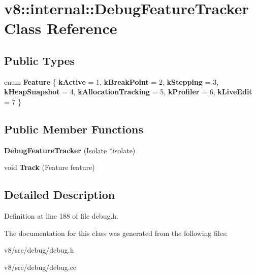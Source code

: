 \hypertarget{classv8_1_1internal_1_1DebugFeatureTracker}{}\section{v8\+:\+:internal\+:\+:Debug\+Feature\+Tracker Class Reference}
\label{classv8_1_1internal_1_1DebugFeatureTracker}
\subsection*{Public Types}
\begin{DoxyCompactItemize}
\item 
\mbox{\label{classv8_1_1internal_1_1DebugFeatureTracker_aba2ecbdea37741ea461e4714d937af5e}} 
enum {\bfseries Feature} \{ \newline
{\bfseries k\+Active} = 1, 
{\bfseries k\+Break\+Point} = 2, 
{\bfseries k\+Stepping} = 3, 
{\bfseries k\+Heap\+Snapshot} = 4, 
\newline
{\bfseries k\+Allocation\+Tracking} = 5, 
{\bfseries k\+Profiler} = 6, 
{\bfseries k\+Live\+Edit} = 7
 \}
\end{DoxyCompactItemize}
\subsection*{Public Member Functions}
\begin{DoxyCompactItemize}
\item 
\mbox{\label{classv8_1_1internal_1_1DebugFeatureTracker_afdaf2c05935442f7fce8be32ce16b2ee}} 
{\bfseries Debug\+Feature\+Tracker} (\mbox{\hyperlink{classv8_1_1internal_1_1Isolate}{Isolate}} $\ast$isolate)
\item 
\mbox{\label{classv8_1_1internal_1_1DebugFeatureTracker_a16745e8377f94a9b4cc9609b2d8d13bd}} 
void {\bfseries Track} (Feature feature)
\end{DoxyCompactItemize}


\subsection{Detailed Description}


Definition at line 188 of file debug.\+h.



The documentation for this class was generated from the following files\+:\begin{DoxyCompactItemize}
\item 
v8/src/debug/debug.\+h\item 
v8/src/debug/debug.\+cc\end{DoxyCompactItemize}
